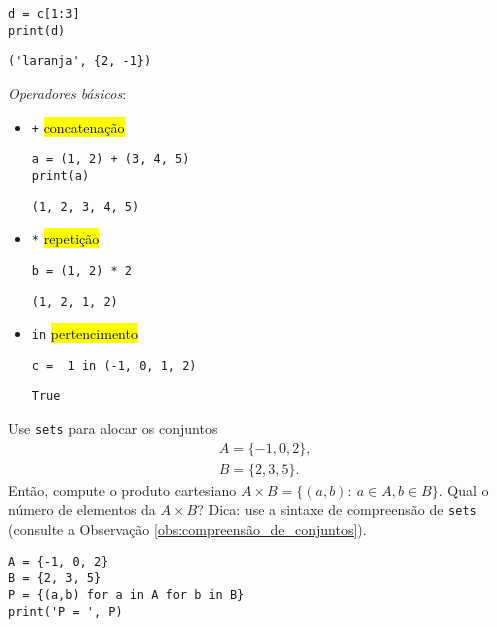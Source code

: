 \begin{lstlisting}
d = c[1:3]
print(d)
\end{lstlisting}

\begin{verbatim}
('laranja', {2, -1})
\end{verbatim}

\emph{Operadores básicos}:

\begin{itemize}
\item[] \texttt{+} \hl{concatenação}

\begin{lstlisting}[framexrightmargin=-2.4em]
a = (1, 2) + (3, 4, 5)
print(a)
\end{lstlisting}

\begin{verbatim}
(1, 2, 3, 4, 5)
\end{verbatim}

\item[] \texttt{*} \hl{repetição}

\begin{lstlisting}[framexrightmargin=-2.4em]
b = (1, 2) * 2
\end{lstlisting}

\begin{verbatim}
(1, 2, 1, 2)
\end{verbatim}

\item[] \texttt{in} \hl{pertencimento}

\begin{lstlisting}[framexrightmargin=-2.4em]
c =  1 in (-1, 0, 1, 2)
\end{lstlisting}

\begin{verbatim}
True
\end{verbatim}

\end{itemize}

\begin{exer}
  Use \texttt{sets} para alocar os conjuntos
  \begin{align}
    &A = \{-1, 0, 2\},\\
    &B = \{2, 3, 5\}.
  \end{align}
  Então, compute o produto cartesiano $A\times B=\{(a,b):~a\in A, b\in B\}$. Qual o número de elementos da $A\times B$? Dica: use a sintaxe de compreensão de \texttt{sets} (consulte a Observação \ref{obs:compreensão_de_conjuntos}).
\end{exer}
\begin{resp}

\begin{lstlisting}
A = {-1, 0, 2}
B = {2, 3, 5}
P = {(a,b) for a in A for b in B}
print('P = ', P)
\end{lstlisting}

\end{resp}

